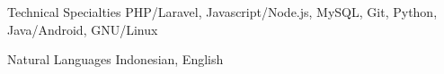 


\begin{cvskills}


\cvskill
{Technical Specialties} %
{PHP/Laravel, Javascript/Node.js, MySQL, Git, Python, Java/Android, GNU/Linux} %


\cvskill
{Natural Languages} %
{Indonesian, English} %


\end{cvskills}
